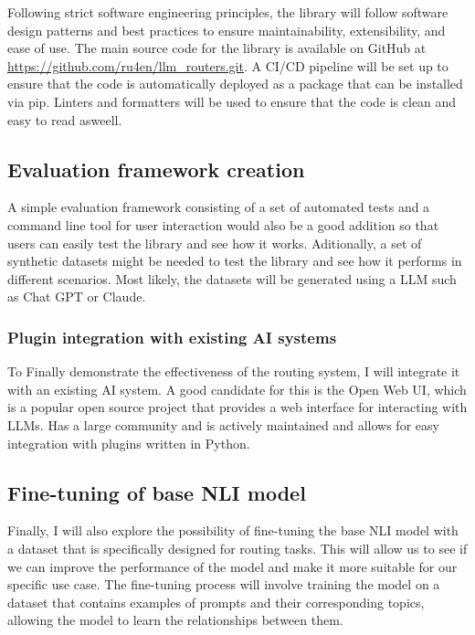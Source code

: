 Following strict software engineering principles, the library will follow software design patterns and best practices to ensure maintainability, extensibility, and ease of use. The main source code for the library is available on GitHub at \url{https://github.com/ru4en/llm_routers.git}. A CI/CD pipeline will be set up to ensure that the code is automatically deployed as a package that can be installed via pip. Linters and formatters will be used to ensure that the code is clean and easy to read asweell.


\subsection{Evaluation framework creation}
\label{sec:evaluation_framework}

A simple evaluation framework consisting of a set of automated tests and a command line tool for user interaction would also be a good addition so that users can easily test the library and see how it works. Aditionally, a set of synthetic datasets might be needed to test the library and see how it performs in different scenarios. Most likely, the datasets will be generated using a LLM such as Chat GPT or Claude.

\subsubsection{Plugin integration with existing AI systems}
\label{sec:plugin_integration}

To Finally demonstrate the effectiveness of the routing system, I will integrate it with an existing AI system. A good candidate for this is the Open Web UI, which is a popular open source project that provides a web interface for interacting with LLMs. Has a large community and is actively maintained and allows for easy integration with plugins written in Python.

\subsection{Fine-tuning of base NLI model}
\label{sec:fine_tuning}

Finally, I will also explore the possibility of fine-tuning the base NLI model with a dataset that is specifically designed for routing tasks. This will allow us to see if we can improve the performance of the model and make it more suitable for our specific use case. The fine-tuning process will involve training the model on a dataset that contains examples of prompts and their corresponding topics, allowing the model to learn the relationships between them.